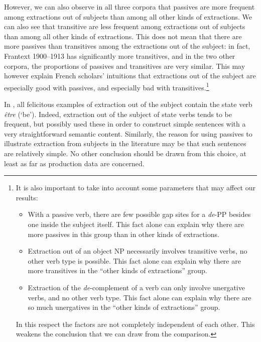 However, we can also observe in all three corpora that passives are more frequent among extractions out of subjects than among all other kinds of extractions. We can also see that transitive are less frequent among extractions out of subjects than among all other kinds of extractions. This does not mean that there are more passives than transitives among the extractions out of the subject: in fact, Frantext 1900--1913 has significantly more transitives, and in the two other corpora, the proportions of passives and transitives are very similar. This may however explain French scholars' intuitions that extractions out of the subject are especially good with passives, and especially bad with transitives.\footnote{It is also important to take into account some parameters that may affect our results: 
\begin{itemize}
    \item With a passive verb, there are few possible gap sites for a \emph{de}-PP besides one inside the subject itself. 
    This fact alone can explain why there are more passives in this group than in other kinds of extractions.
    \item Extraction out of an object NP necessarily involves transitive verbs, no other verb type is possible. This fact alone can explain why there are more transitives in the ``other kinds of extractions'' group.
    \item Extraction of the \emph{de}-complement of a verb can only involve unergative verbs, and no other verb type. This fact alone can explain why there are so much unergatives in the ``other kinds of extractions'' group.
\end{itemize}
In this respect the factors are not completely independent of each other. This weakens the conclusion that we can draw from the comparison.}

In \citet{Godard.1988}, all felicitous examples of extraction out of the subject contain the state verb \emph{être} (`be'). Indeed, extraction out of the subject of state verbs tends to be frequent, but possibly \citeauthor{Godard.1988} used these in order to construct simple sentences with a very straightforward semantic content. Similarly, the reason for using passives to illustrate extraction from subjects in the literature may be that such sentences are relatively simple. No other conclusion should be drawn from this choice, at least as far as production data are concerned.


